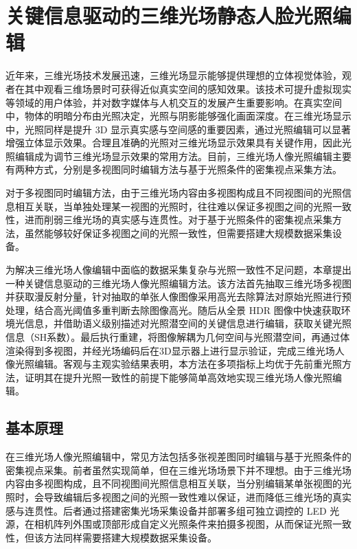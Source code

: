 \chapter{关键信息驱动的三维光场静态人脸光照编辑}

近年来，三维光场技术发展迅速，三维光场显示能够提供理想的立体视觉体验，观者在其中观看三维场景时可获得近似真实空间的感知效果。该技术可提升虚拟现实等领域的用户体验，并对数字媒体与人机交互的发展产生重要影响。在真实空间中，物体的明暗分布由光照决定，光照与阴影能够强化画面深度。在三维光场显示中，光照同样是提升 3D 显示真实感与空间感的重要因素，通过光照编辑可以显著增强立体显示效果。合理且准确的光照对三维光场显示效果具有关键作用，因此光照编辑成为调节三维光场显示效果的常用方法。目前，三维光场人像光照编辑主要有两种方式，分别是多视图同时编辑方法与基于光照条件的密集视点采集方法。

对于多视图同时编辑方法，由于三维光场内容由多视图构成且不同视图间的光照信息相互关联，当单独处理某一视图的光照时，往往难以保证多视图之间的光照一致性，进而削弱三维光场的真实感与连贯性。对于基于光照条件的密集视点采集方法，虽然能够较好保证多视图之间的光照一致性，但需要搭建大规模数据采集设备。

为解决三维光场人像编辑中面临的数据采集复杂与光照一致性不足问题，本章提出一种关键信息驱动的三维光场人像光照编辑方法。该方法首先抽取三维光场多视图并获取漫反射分量，针对抽取的单张人像图像采用高光去除算法对原始光照进行预处理，结合高光阈值多重判断去除图像高光。随后从全景 HDR 图像中快速获取环境光信息，并借助语义级别描述\cite{Dong2016,Sennrich2016,Vaswani2017}对光照潜空间的关键信息进行编辑，获取关键光照信息（SH系数）\cite{Google2025,Ramamoorthi2001}。最后执行重建，将图像解耦为几何空间与光照潜空间\cite{Jiang2023}，再通过体渲染\cite{Mildenhall2022}得到多视图，并经光场编码后在3D显示器上进行显示验证，完成三维光场人像光照编辑。客观与主观实验结果表明，本方法在多项指标上均优于先前重光照方法，证明其在提升光照一致性的前提下能够简单高效地实现三维光场人像光照编辑。



\section{基本原理}
在三维光场人像光照编辑中，常见方法包括多张视差图同时编辑与基于光照条件的密集视点采集。前者虽然实现简单，但在三维光场场景下并不理想。由于三维光场内容由多视图构成，且不同视图间光照信息相互关联，当分别编辑某单张视图的光照时，会导致编辑后多视图之间的光照一致性难以保证，进而降低三维光场的真实感与连贯性。后者通过搭建密集光场采集设备并部署多组可独立调控的 LED 光源，在相机阵列外围或顶部形成自定义光照条件来拍摄多视图，从而保证光照一致性，但该方法同样需要搭建大规模数据采集设备。

